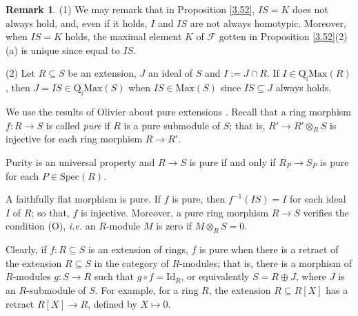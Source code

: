 \documentclass[12pt,leqno]{amsart}
\theoremstyle{definition}
\newtheorem{remark}[theorem]{Remark}
\begin{document}
\begin{remark}\label{3.54} (1) We may remark that in Proposition \ref{3.52}, $IS=K$ does not always hold, and, even if it holds, $I$ and $IS$ are not always homotypic. Moreover, when $IS=K$ holds, the maximal element $K$ of $\mathcal F$ gotten in Proposition \ref{3.52}(2)(a) is unique since equal to $IS$. 

(2) Let $R\subseteq S$ be an extension, $J$ an ideal of $S$ and $I:=J\cap R$. If $I\in\mathrm{Q_iMax}(R)$,  then $J=IS\in\mathrm{Q_iMax}(S)$ 
 when $IS\in\mathrm{Max}(S)$ since $IS\subseteq J$ always holds.
\end{remark}

We use the results of Olivier about pure extensions \cite{OP}. Recall that a ring morphism $f:R\to S$ is called {\it pure} if $R$ is a pure submodule of $ S$; that is, $R'\to R'\otimes_RS$ is injective for each ring morphism $R\to R'$.  
 
Purity is an universal property and $R\to S$ is pure if and only if $R_P\to S_P$ is pure for each $P\in \mathrm{Spec}(R)$.

A faithfully flat morphism is pure. If $f$ is pure, then $f^{-1}(IS)=I$ for each ideal $I$ of $R$; so that, $f$ is injective. Moreover, a pure ring morphism $R\to S$ verifies the condition (O), {\em i.e.} an $R$-module $M$ is zero if $M\otimes_RS = 0$.

Clearly, if $f:R\subseteq S$ is an extension of rings, $f$ is pure when there is a retract of the extension $R\subseteq S$ in the category of $R$-modules; that is, there is a morphism of $R$-modules $g:S\to R$ such that $g\circ f=\mathrm{Id}_R$, or equivalently $S=R\oplus J$, where $J$ is an $R$-submodule of $S$. For example, for a ring $R$, the extension $R\subseteq R[X]$ has a retract $R[X]\to R$, defined by $X\mapsto 0$.
\end{document}
